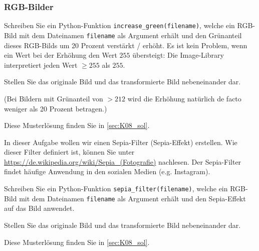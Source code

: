 \subsubsection{RGB-Bilder}
\begin{myexercise}
	Schreiben Sie ein Python-Funktion \lstinline|increase_green(filename)|, welche ein RGB-Bild mit dem Dateinamen \lstinline|filename| als Argument erhält und den Grünanteil dieses RGB-Bilds um 20 Prozent verstärkt / erhöht. Es ist kein Problem, wenn ein Wert bei der Erhöhung den Wert \(255\) übersteigt: Die Image-Library interpretiert jeden Wert \(\geq 255\) als \(255\).

	Stellen Sie das originale Bild und das transformierte Bild nebeneinander dar.

	(Bei Bildern mit Grünanteil von \(> 212\) wird die Erhöhung natürlich de facto weniger als 20 Prozent betragen.)
	\begin{myanswer}
		Diese Musterlösung finden Sie in \cref{sec:K08_sol}.
	\end{myanswer}
\end{myexercise}

\begin{myexercise}
	In dieser Aufgabe wollen wir einen Sepia-Filter (Sepia-Effekt) erstellen. Wie dieser Filter definiert ist, können Sie unter \url{https://de.wikipedia.org/wiki/Sepia_(Fotografie)} nachlesen. Der Sepia-Filter findet häufige Anwendung in den sozialen Medien (e.g. Instagram).

	Schreiben Sie ein Python-Funktion \lstinline|sepia_filter(filename)|, welche ein RGB-Bild mit dem Dateinamen \lstinline|filename| als Argument erhält und den Sepia-Effekt auf das Bild anwendet.

	Stellen Sie das originale Bild und das transformierte Bild nebeneinander dar.
	\begin{myanswer}
		Diese Musterlösung finden Sie in \cref{sec:K08_sol}.
	\end{myanswer}
\end{myexercise}

